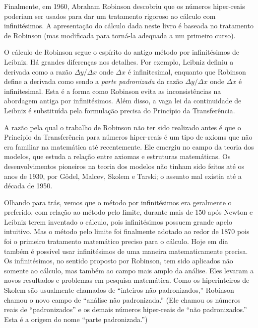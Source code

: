 \documentclass{svmono}
\begin{document}
Finalmente, em 1960, Abraham Robinson descobriu que os números hiper-reais
poderiam ser usados para dar um tratamento rigoroso ao cálculo com
infinitésimos. A apresentação do cálculo dada neste livro é baseada
no tratamento de Robinson (mas modificada para torná-la adequada a um
primeiro curso).

O cálculo de Robinson segue o espírito do antigo método por infinitésimos
de Leibniz. Há grandes diferenças nos detalhes. Por exemplo, Leibniz
definiu a derivada como a razão $\Delta y / \Delta x$ onde $\Delta x$
é infinitesimal, enquanto que Robinson define a derivada como sendo
a \emph{parte padronizada} da razão $\Delta y / \Delta x$ onde $\Delta x$
é infinitesimal. Esta é a forma como Robinson evita as inconsistências
na abordagem antiga por infinitésimos. Além disso, a vaga lei da
continuidade de Leibniz é substituída pela formulação precisa do
Princípio da Transferência.

A razão pela qual o trabalho de Robinson não ter sido realizado antes é
que o Princípio da Transferência para números hiper-reais é um tipo de
axioms que não era familiar na matemática até recentemente. Ele emergiu
no campo da teoria dos modelos, que estuda a relação entre axiomas e
estruturas matemáticas. Os desenvolvimentos pioneiros na teoria dos
modelos não tinham sido feitos até os anos de 1930, por Gödel, Malcev,
Skolem e Tarski; o assunto mal existia até a década de 1950.

Olhando para trás, vemos que o método por infinitésimos era geralmente
o preferido, com relação ao método pelo limite, durante mais de 150 após
Newton e Leibniz terem inventado o cálculo, pois infinitésimos possuem
grande apelo intuitivo. Mas o método pelo limite foi finalmente adotado
ao redor de 1870 pois foi o primeiro tratamento matemático preciso para
o cálculo. Hoje em dia também é possível usar infinitésimos de uma
maneira matematicamente precisa. Os infinitésimos, no sentido proposto
por Robinson, tem sido aplicados não somente ao cálculo, mas também
ao campo mais amplo da análise. Eles levaram a novos resultados e
problemas em pesquisa matemática. Como os hiperinteiros de Skolem são
usualmente chamados de ``inteiros não padronizados,'' Robinson chamou
o novo campo de ``análise não padronizada.'' (Ele chamou os números
reais de ``padronizados'' e os demais números hiper-reais de
``não padronizados.'' Esta é a origem do nome ``parte padronizada.'')
\end{document}
